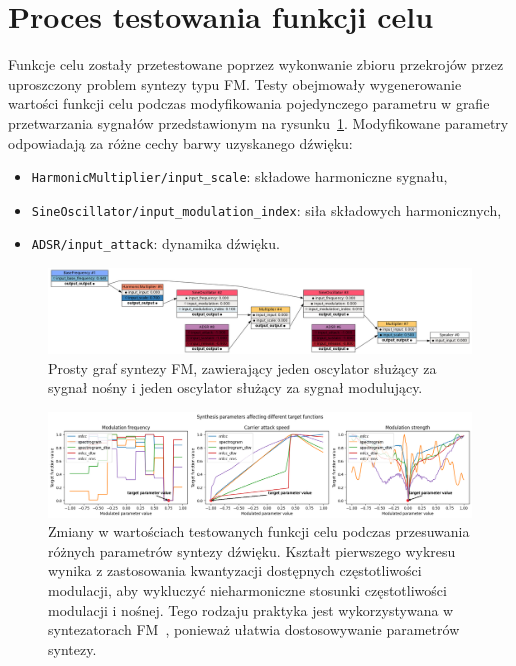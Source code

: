 \section{Proces testowania funkcji celu}

Funkcje celu zostały przetestowane poprzez wykonwanie
zbioru przekrojów przez uproszczony problem syntezy typu FM.
Testy obejmowały wygenerowanie wartości funkcji celu podczas
modyfikowania pojedynczego parametru w grafie przetwarzania sygnałów
przedstawionym na rysunku~\ref{fig:fm_graph_for_benchmarks}.
Modyfikowane parametry odpowiadają za różne cechy barwy uzyskanego dźwięku:

\begin{itemize}
  \item \texttt{HarmonicMultiplier/input\_scale}:  składowe harmoniczne sygnału,
  \item \texttt{SineOscillator/input\_modulation\_index}: siła składowych harmonicznych,
  \item \texttt{ADSR/input\_attack}: dynamika dźwięku.
\end{itemize}

\begin{figure}[H]
    \centering
    \includegraphics[width=1.0\linewidth]{rys03/fm_graph_for_benchmarks.png}
    \caption{
      Prosty graf syntezy FM, zawierający jeden oscylator służący za sygnał nośny
      i jeden oscylator służący za sygnał modulujący.
    }
    \label{fig:fm_graph_for_benchmarks}
\end{figure}

\begin{figure}[H]
    \centering
    \includegraphics[width=1.0\linewidth]{rys03/target_function_testing.png}
    \caption{
      Zmiany w wartościach testowanych funkcji celu podczas przesuwania różnych parametrów syntezy dźwięku. 
      Kształt pierwszego wykresu wynika z zastosowania kwantyzacji dostępnych częstotliwości modulacji,
      aby wykluczyć nieharmoniczne stosunki częstotliwości modulacji i nośnej. Tego rodzaju praktyka
      jest wykorzystywana w syntezatorach FM~\cite{digitone_manual}, ponieważ ułatwia dostosowywanie parametrów syntezy.
    }
    \label{fig:target_function_testing}
\end{figure}

